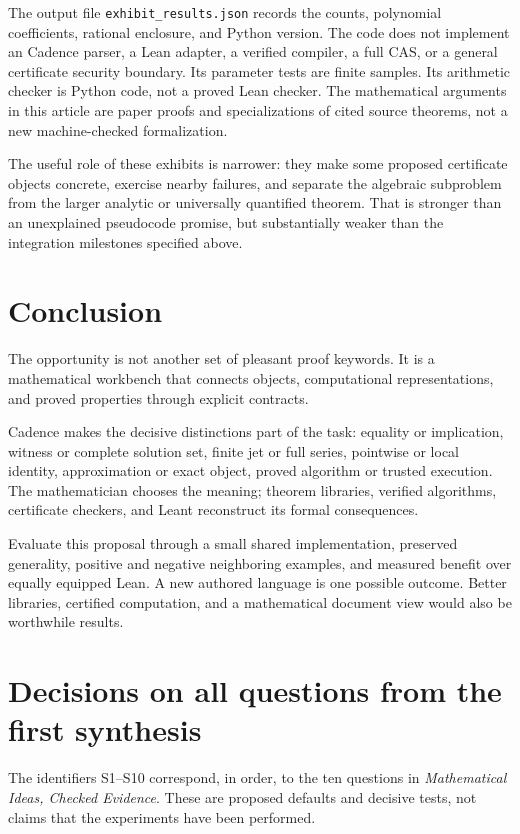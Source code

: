 \documentclass[11pt,letterpaper]{article}
\newcommand{\code}[1]{\nolinkurl{#1}}
\theoremstyle{definition}
\begin{document}
The output file \code{exhibit_results.json} records the counts, polynomial
coefficients, rational enclosure, and Python version. The code does not implement
an Cadence parser, a Lean adapter, a verified compiler, a full CAS, or a general
certificate security boundary. Its parameter tests are finite samples. Its
arithmetic checker is Python code, not a proved Lean checker. The mathematical
arguments in this article are paper proofs and specializations of cited
source theorems, not a new machine-checked formalization.

The useful role of these exhibits is narrower: they make some proposed certificate
objects concrete, exercise nearby failures, and separate the algebraic subproblem
from the larger analytic or universally quantified theorem. That is stronger than
an unexplained pseudocode promise, but substantially weaker than the integration
milestones specified above.

\section{Conclusion}
The opportunity is not another set of pleasant proof keywords. It is a mathematical
workbench that connects objects, computational representations, and proved
properties through explicit contracts.

Cadence makes the decisive distinctions part of the task: equality or implication,
witness or complete solution set, finite jet or full series, pointwise or local
identity, approximation or exact object, proved algorithm or trusted execution.
The mathematician chooses the meaning; theorem libraries, verified algorithms,
certificate checkers, and Leant reconstruct its formal consequences.

Evaluate this proposal through a small shared implementation, preserved generality,
positive and negative neighboring examples, and measured benefit over equally
equipped Lean. A new authored language is one possible outcome. Better libraries,
certified computation, and a mathematical document view would also be worthwhile
results.

\clearpage
\appendix
\section{Decisions on all questions from the first synthesis}\label{app:questionsS}
The identifiers S1--S10 correspond, in order, to the ten questions in
\emph{Mathematical Ideas, Checked Evidence}\cite{synthesis}. These are proposed
defaults and decisive tests, not claims that the experiments have been performed.
\end{document}
